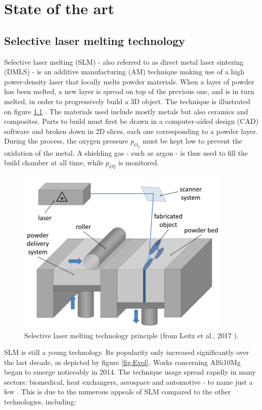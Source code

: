 \chapter{State of the art}
\label{Chap2}
\section{Selective laser melting technology}
Selective laser melting (SLM) - also referred to as direct metal laser sintering (DMLS) - is an additive manufacturing  (AM) technique making use of a high power-density laser that locally melts powder materials.%
 When a layer of powder has been melted, a new layer is spread on top of the previous one, and is in turn melted, in order to progressively build a 3D object. The technique is illustrated on figure \ref{fig:SLM} \parencite{LEITZ2017331}. The materials used include mostly metals but also ceramics and composites. Parts to build must first be drawn in a computer-aided design (CAD) software and broken down in 2D slices, each one corresponding to a powder layer. During the process, the oxygen pressure $p_{O_2}$ must be kept low to prevent the oxidation of the metal. A shielding gas - such as argon - is thus used to fill the build chamber at all time, while $p_{O2}$ is monitored.   \\

\begin{figure}[ht]
\centering
\includegraphics[scale=0.7]{Images/SLM}
\decoRule
\caption[Selective laser melting technology principle]{Selective laser melting technology principle (from Leitz et al., 2017 \parencite{LEITZ2017331}).}
\label{fig:SLM}
\end{figure}

SLM is still a young technology. Its popularity only increased significantly over the last decade, as depicted by figure \ref{fig:Evol}. Works concerning AlSi10Mg began to emerge noticeably in 2014. The technique usage spread rapidly in many sectors: biomedical, heat exchangers, aerospace and automotive - to name just a few \parencite{Yap}. This is due to the numerous appeals of SLM compared to the other technologies, including:\\

